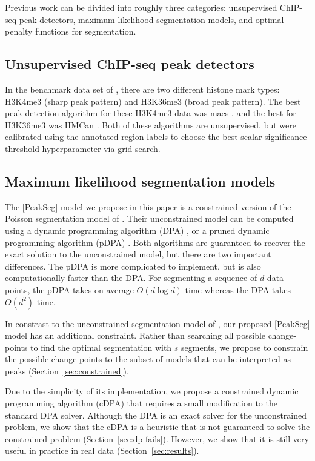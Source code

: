 \documentclass{article}
\begin{document}
Previous work can be divided into roughly three categories:
unsupervised ChIP-seq peak detectors, maximum likelihood segmentation
models, and optimal penalty functions for segmentation.

\subsection{Unsupervised ChIP-seq peak detectors}

In the benchmark data set of \citet{hocking2014visual}, there are two
different histone mark types: H3K4me3 (sharp peak pattern) and
H3K36me3 (broad peak pattern). The best peak detection algorithm for
these H3K4me3 data was macs \citep{MACS}, and the best for H3K36me3
was HMCan \citep{HMCan}. Both of these algorithms are unsupervised,
but were calibrated using the annotated region labels to choose the
best scalar significance threshold hyperparameter via grid search.

\subsection{Maximum likelihood segmentation models}

The \ref{PeakSeg} model we propose in this paper is a constrained
version of the Poisson segmentation model of \citet{Segmentor}.
Their unconstrained model can be computed using a dynamic programming
algorithm (DPA) \citep{bellman}, or a pruned dynamic programming
algorithm (pDPA) \citep{pruned-dp}. Both algorithms are guaranteed to
recover the exact solution to the unconstrained model, but there are
two important differences. The pDPA is more complicated to implement,
but is also computationally faster than the DPA. For segmenting a
sequence of $d$ data points, the pDPA takes on average $O(d\log d)$
time whereas the DPA takes $O(d^2)$ time. 

In constrast to the unconstrained segmentation model of
\citet{Segmentor}, our proposed \ref{PeakSeg} model has an additional
constraint. Rather than searching all possible change-points to find
the optimal segmentation with $s$ segments, we propose to constrain
the possible change-points to the subset of models that can be
interpreted as peaks (Section~\ref{sec:constrained}).

Due to the simplicity of its implementation, we propose a constrained
dynamic programming algorithm (cDPA) that requires a small
modification to the standard DPA solver. Although the DPA is an exact
solver for the unconstrained problem, we show that the cDPA is a
heuristic that is not guaranteed to solve the constrained
problem (Section~\ref{sec:dp-fails}). However, we show that it is
still very useful in practice in real data
(Section~\ref{sec:results}).
\end{document}
